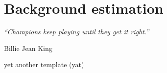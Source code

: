 \chapter{Background estimation}
\label{ch:bkg_estimation}
\epigraph{\emph{“Champions keep playing until they get it right.”}}{Billie Jean King}

yet another template (yat)